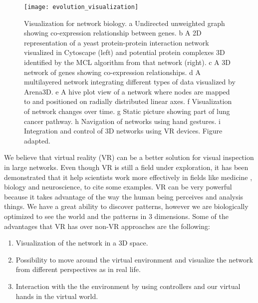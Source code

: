 \begin{figure}[h!]
    \newlength{\tempheight}
    \setlength{\tempheight}{15ex}
    \centering%
    \texttt{[image: evolution\_visualization]}
    \caption{Visualization for network biology. a Undirected unweighted graph showing co-expression relationship between genes. b A 2D representation of a yeast protein-protein interaction network visualized in Cytoscape (left) and potential protein complexes 3D identified by the MCL algorithm from that network (right). c A 3D network of genes showing co-expression relationships. d A multilayered network integrating different types of data visualized by Arena3D. e A hive plot view of a network where nodes are mapped to and positioned on radially distributed linear axes. f Visualization of network changes over time. g Static picture showing part of lung cancer pathway. h Navigation of networks using hand gestures. i Integration and control of 3D networks using VR devices. Figure adapted\cite{pavlopoulos_malliarakis_papanikolaou_theodosiou_enright_iliopoulos_2015}.}
    \label{fig:network_biology_evolution}
\end{figure}%

We believe that virtual reality (VR) can be a better solution for visual inspection in large networks. Even though VR is still a field under exploration, it has been demonstrated that it help scientists work more effectively in fields like medicine \cite{Laver11}\cite{xia_ip_samman_wong_gateno_wang_yeung_kot_tideman_2001}\cite{brain_damage_rehab}, biology\cite{10.1093/bioinformatics/bti581}\cite{thorley_lawson_duca_shapiro_2008} and neuroscience\cite{bohil_alicea_biocca_2011}\cite{minderer_harvey_donato_moser_2016}, to  cite some examples. VR can be very powerful because it takes advantage of the way the human being perceives and analysis things. We have a great ability to discover patterns, however we are biologically optimized to see the world and the patterns in 3 dimensions. Some of the advantages that VR has over non-VR approaches are the following:

\begin{enumerate}
  \item Visualization of the network in a 3D space.
  \item Possibility to move around the virtual environment and visualize the network from different perspectives as in real life.
  \item Interaction with the the environment by using controllers and our virtual hands in the virtual world.
\end{enumerate}

